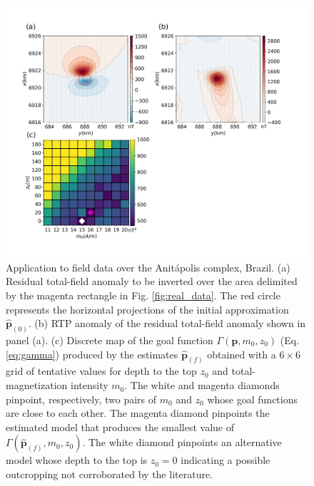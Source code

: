 \begin{figure}
    \centering
    \includegraphics[width=\linewidth]{figures/anitapolis_rtp.png}
    \caption{Application to field data over the Anit{\'a}polis complex, Brazil. 
    (a) Residual total-field anomaly to be inverted over the area delimited by the 
    magenta rectangle in Fig. \ref{fig:real_data}. The red circle represents the
    horizontal projections of the initial approximation $\hat{\mathbf{p}}_{(0)}$.
    (b) RTP anomaly of the  residual total-field anomaly shown in panel (a).
    (c) Discrete map of the goal function $\Gamma(\mathbf{p}, m_0, z_0)$ (Eq.
    \ref{eq:gamma}) produced by the estimates $\hat{\mathbf{p}}_{(f)}$ obtained with
    a $6 \times 6$ grid of tentative values for depth to the top $z_0$ and
    total-magnetization intensity $m_0$.
    The white and magenta diamonds pinpoint, respectively, two pairs of $m_0$ and
    $z_0$ whose goal functions are close to each other. The magenta diamond pinpoints the estimated model that produces the smallest value of 
    $\Gamma(\hat{\mathbf{p}}_{(f)}, m_0, z_0)$.
    The white diamond pinpoints an alternative model whose depth to the top is $z_0=0$ indicating a possible outcropping not corroborated by the literature.	 
}
    \label{fig:anitapolis_rtp}
\end{figure}



